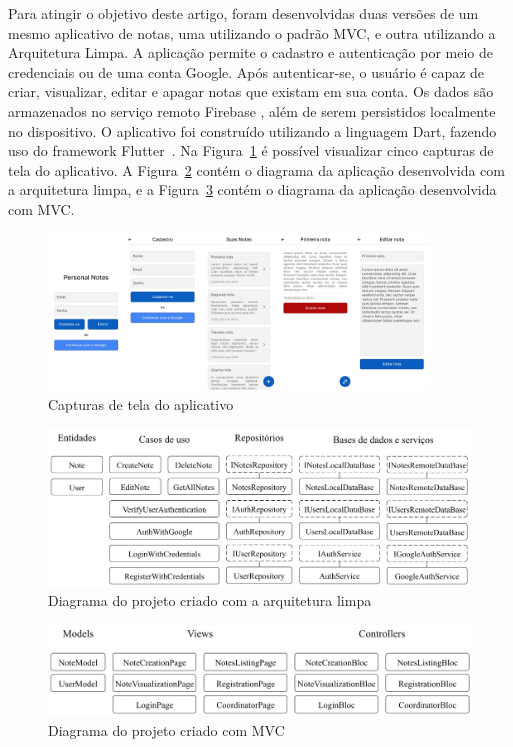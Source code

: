 Para atingir o objetivo deste artigo, foram desenvolvidas duas versões de um mesmo aplicativo de notas, uma utilizando o padrão MVC, e outra utilizando a Arquitetura Limpa.
A aplicação permite o cadastro e autenticação por meio de credenciais ou de uma conta Google.
Após autenticar-se, o usuário é capaz de criar, visualizar, editar e apagar notas que existam em sua conta.
Os dados são armazenados no serviço remoto Firebase \cite{firebase}, além de serem persistidos localmente no dispositivo.
O aplicativo foi construído utilizando a linguagem Dart, fazendo uso do framework Flutter~\cite{flutter}.
Na Figura~\ref{fig:screenshots} é possível visualizar cinco capturas de tela do aplicativo.
A Figura~\ref{fig:project_clean_arch} contém o diagrama da aplicação desenvolvida com a arquitetura limpa, e a Figura~\ref{fig:project_mvc} contém o diagrama da aplicação desenvolvida com MVC.

\begin{figure}[ht]
	\centering
	\includegraphics[width=0.9\textwidth]{images/screenshots.png}
	\caption{Capturas de tela do aplicativo}
	\label{fig:screenshots}
\end{figure}

\begin{figure}[ht]
	\centering
	\includegraphics[width=1\textwidth]{images/project_clean_arch.png}
	\caption{Diagrama do projeto criado com a arquitetura limpa}
	\label{fig:project_clean_arch}
\end{figure}

\begin{figure}[ht]
	\centering
	\includegraphics[width=1\textwidth]{images/project_mvc.png}
	\caption{Diagrama do projeto criado com MVC}
	\label{fig:project_mvc}
\end{figure}